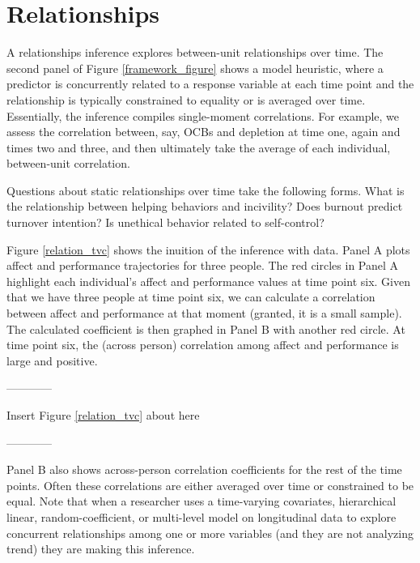 \documentclass[english,,man]{apa6}
\theoremstyle{definition}
\theoremstyle{definition}
\theoremstyle{definition}
\theoremstyle{remark}
\begin{document}
\hypertarget{relationships}{%
\section{Relationships}\label{relationships}}

A relationships inference explores between-unit relationships over time.
The second panel of Figure \ref{framework_figure} shows a model
heuristic, where a predictor is concurrently related to a response
variable at each time point and the relationship is typically
constrained to equality or is averaged over time. Essentially, the
inference compiles single-moment correlations. For example, we assess
the correlation between, say, OCBs and depletion at time one, again and
times two and three, and then ultimately take the average of each
individual, between-unit correlation.

Questions about static relationships over time take the following forms.
What is the relationship between helping behaviors and incivility? Does
burnout predict turnover intention? Is unethical behavior related to
self-control?

Figure \ref{relation_tvc} shows the inuition of the inference with data.
Panel A plots affect and performance trajectories for three people. The
red circles in Panel A highlight each individual's affect and
performance values at time point six. Given that we have three people at
time point six, we can calculate a correlation between affect and
performance at that moment (granted, it is a small sample). The
calculated coefficient is then graphed in Panel B with another red
circle. At time point six, the (across person) correlation among affect
and performance is large and positive.

\begin{center}

------------

Insert Figure \ref{relation_tvc} about here

------------

\end{center}

Panel B also shows across-person correlation coefficients for the rest
of the time points. Often these correlations are either averaged over
time or constrained to be equal. Note that when a researcher uses a
time-varying covariates, hierarchical linear, random-coefficient, or
multi-level model on longitudinal data to explore concurrent
relationships among one or more variables (and they are not analyzing
trend) they are making this inference.
\end{document}

